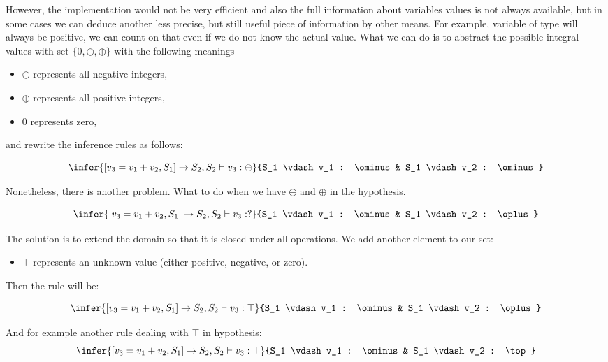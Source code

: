         However, the implementation would not be very efficient and also the full 
        information about variables values is not always available, but in some cases 
        we can deduce another less precise, but still useful piece of information 
        by other means. For example, variable of type  will 
        always be positive, we can count on that even if we do not know the actual value. 
        What we can do is to abstract the possible integral values with set 
        $\{0, \ominus, \oplus\}$ with the following meanings         
        \begin{itemize}
            \item $\ominus$ represents all negative integers,
            \item $\oplus$ represents all positive integers,
            \item $0$ represents zero,
        \end{itemize}                
        and rewrite the inference rules as follows:
        
        $$
        \infer{[v_3=v_1+v_2, S_1] \rightarrow S_2, S_2 \vdash v_3 : \ominus}
        {S_1 \vdash v_1 : \ominus & S_1 \vdash v_2 : \ominus}
        $$
        
        Nonetheless, there is another problem. What to do when we have $\ominus$ 
        and $\oplus$ in the hypothesis.
        
        $$
        \infer{[v_3=v_1+v_2, S_1] \rightarrow S_2, S_2 \vdash v_3 : ?}
        {S_1 \vdash v_1 : \ominus & S_1 \vdash v_2 : \oplus}
        $$
        
        The solution is to extend the domain so that it is closed under all operations. 
        We add another element to our set:
        \begin{itemize}
            \item $\top$ represents an unknown value (either positive, negative, or zero).
        \end{itemize}
        Then the rule will be:
        
        $$
        \infer{[v_3=v_1+v_2, S_1] \rightarrow S_2, S_2 \vdash v_3 : \top}
        {S_1 \vdash v_1 : \ominus & S_1 \vdash v_2 : \oplus}
        $$        
        
        And for example another rule dealing with $\top$ in hypothesis:
        $$
        \infer{[v_3=v_1+v_2, S_1] \rightarrow S_2, S_2 \vdash v_3 : \top}
        {S_1 \vdash v_1 : \ominus & S_1 \vdash v_2 : \top}
        $$
        
